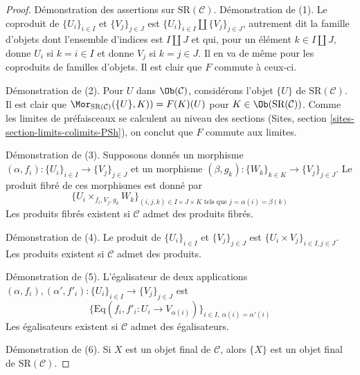 \begin{proof}
Démonstration des assertions sur $\text{SR}(\mathcal{C})$.
Démonstration de (1). Le coproduit de $\{U_i\}_{i \in I}$ et $\{V_j\}_{j \in J}$ est
$\{U_i\}_{i \in I} \amalg \{V_j\}_{j \in J}$, autrement dit la famille
d'objets dont l'ensemble d'indices est $I \amalg J$ et qui, pour un élément
$k \in I \amalg J$, donne $U_i$ si $k = i \in I$ et donne $V_j$ si
$k = j \in J$. Il en va de même pour les coproduits
de familles d'objets. Il est clair que $F$ commute à ceux-ci.

\medskip\noindent
Démonstration de (2). Pour $U$ dans $\Ob(\mathcal{C})$, considérons l'objet $\{U\}$ de
$\text{SR}(\mathcal{C})$. Il est clair que
$\Mor_{\text{SR}(\mathcal{C})}(\{U\}, K)) = F(K)(U)$
pour $K \in \Ob(\text{SR}(\mathcal{C}))$. Comme les limites de préfaisceaux
se calculent au niveau des sections
(Sites, section \ref{sites-section-limits-colimits-PSh}),
on conclut que $F$ commute aux limites.

\medskip\noindent
Démonstration de (3). Supposons donnés un morphisme
$(\alpha, f_i) : \{U_i\}_{i \in I} \to \{V_j\}_{j \in J}$
et un morphisme
$(\beta, g_k) : \{W_k\}_{k \in K} \to \{V_j\}_{j \in J}$.
Le produit fibré de ces morphismes est donné par
$$
\{ U_i \times_{f_i, V_j, g_k} W_k\}_{(i, j, k) \in I \times J \times K
\text{ tels que } j = \alpha(i) = \beta(k)}
$$
Les produits fibrés existent si $\mathcal{C}$ admet des produits fibrés.

\medskip\noindent
Démonstration de (4). Le produit de $\{U_i\}_{i \in I}$ et $\{V_j\}_{j \in J}$ est
$\{U_i \times V_j\}_{i \in I, j \in J}$. Les produits existent si
$\mathcal{C}$ admet des produits.

\medskip\noindent
Démonstration de (5). L'égalisateur de deux applications
$(\alpha, f_i), (\alpha', f'_i) : \{U_i\}_{i \in I} \to \{V_j\}_{j \in J}$
est
$$
\{
\text{Eq}(f_i, f'_i : U_i \to V_{\alpha(i)})
\}_{i \in I,\ \alpha(i) = \alpha'(i)}
$$
Les égalisateurs existent si $\mathcal{C}$ admet des égalisateurs.

\medskip\noindent
Démonstration de (6). Si $X$ est un objet final de $\mathcal{C}$, alors
$\{X\}$ est un objet final de $\text{SR}(\mathcal{C})$.


\end{proof}
